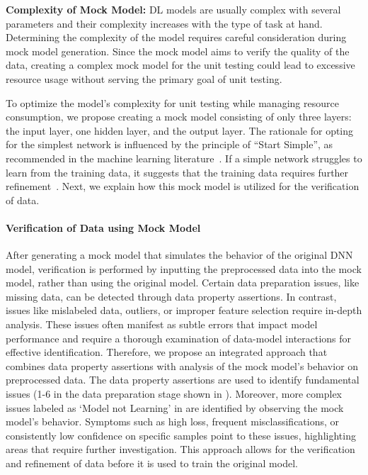 \textbf{Complexity of Mock Model:}
DL models are usually complex with several parameters and their complexity increases with the type of task at hand.
Determining the complexity of the model requires careful consideration during mock model generation.
Since the mock model aims to verify the quality of the data, creating a complex mock model for the unit testing could lead to excessive resource usage without serving the primary goal of unit testing.

To optimize the model's complexity for unit testing while managing resource consumption, we propose creating a mock model 
consisting of only three layers: the input layer, one hidden layer, and the output layer.
The rationale for opting for the simplest network is influenced by the 
principle of ``Start Simple'', as recommended in the machine learning literature~\cite{andrewng, occamrazor}. 
If a simple network struggles to learn from the training data, it suggests that the training data requires further refinement~\cite{yu2020hyper}.
Next, we explain how this mock model is utilized for the verification of data.

\paragraph{Verification of Data using Mock Model}
After generating a mock model that simulates the behavior of the original DNN model, verification is performed by inputting the preprocessed data into the mock model, rather than using the original model. Certain data preparation issues, like missing data, can be detected through data property assertions. In contrast, issues like mislabeled data, outliers, or improper feature selection require in-depth analysis. 
These issues often manifest as subtle errors that impact model performance and require a thorough examination of data-model interactions for effective identification. Therefore, we propose an integrated approach that combines data property assertions with analysis of the mock model's behavior on preprocessed data. The data property assertions are used to identify fundamental issues (1-6 in the data preparation stage shown in ).  
Moreover, more complex issues 
labeled as ‘Model not Learning’ in  are identified by observing the mock model’s behavior. Symptoms such as high loss, frequent misclassifications, or consistently low confidence on specific samples point to these issues, highlighting areas that require further investigation. This approach allows for the verification and refinement of data before it is used to train the original model.


